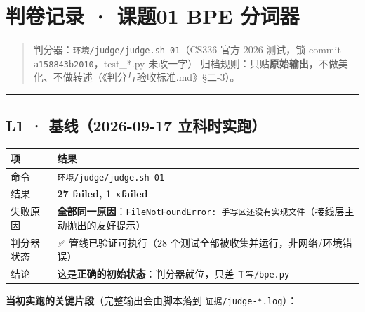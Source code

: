 \documentclass[
  chinese,
  11pt,
]{ctexart}
\newcounter{none} %
\begin{document}
\newpage

\section{判卷记录 · 课题01 BPE 分词器}\label{ux5224ux5377ux8bb0ux5f55-ux8bfeux989801-bpe-ux5206ux8bcdux5668}

\begin{quote}
判分器：\texttt{环境/judge/judge.sh\ 01}（CS336 官方 2026 测试，锁 commit \texttt{a158843b2010}，test\_*.py 未改一字） 归档规则：只贴\textbf{原始输出}，不做美化、不做转述（《判分与验收标准.md》§二-3）。
\end{quote}

\begin{center}\rule{0.5\linewidth}{0.5pt}\end{center}

\subsection{L1 · 基线（2026-09-17 立科时实跑）}\label{l1-ux57faux7ebf2026-09-17-ux7acbux79d1ux65f6ux5b9eux8dd1}

{\def\LTcaptype{none} %
\begin{longtable}[]{@{}
  >{\raggedright\arraybackslash}p{}
  >{\raggedright\arraybackslash}p{}@{}}
\toprule\noalign{}
\begin{minipage}[b]{\linewidth}\raggedright
项
\end{minipage} & \begin{minipage}[b]{\linewidth}\raggedright
结果
\end{minipage} \\
\midrule\noalign{}
\endhead
\bottomrule\noalign{}
\endlastfoot
命令 & \texttt{环境/judge/judge.sh\ 01} \\
结果 & \textbf{27 failed, 1 xfailed} \\
失败原因 & \textbf{全部同一原因}：\texttt{FileNotFoundError:\ 手写区还没有实现文件}（接线层主动抛出的友好提示） \\
判分器状态 & ✅ 管线已验证可执行（28 个测试全部被收集并运行，非网络/环境错误） \\
结论 & 这是\textbf{正确的初始状态}：判分器就位，只差 \texttt{手写/bpe.py} \\
\end{longtable}
}

\textbf{当初实跑的关键片段}（完整输出会由脚本落到 \texttt{证据/judge-*.log}）：
\end{document}
